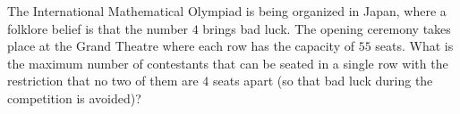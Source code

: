 The International Mathematical Olympiad is being organized in Japan, where a folklore belief is that the number $4$ brings bad luck. The opening ceremony takes place at the Grand Theatre where each row has the capacity of $55$ seats. What is the maximum number of contestants that can be seated in a single row with the restriction that no two of them are $4$ seats apart (so that bad luck during the competition is avoided)?